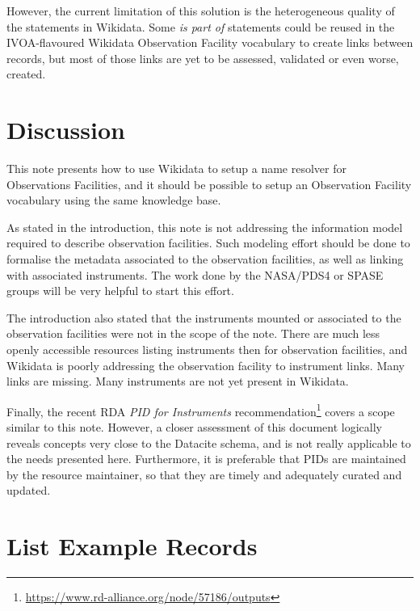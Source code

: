 \documentclass[11pt,a4paper]{ivoa}
\begin{document}
However, the current limitation of this solution is the heterogeneous 
quality of the statements in Wikidata. Some \emph{is part of} 
statements could be reused in the IVOA-flavoured Wikidata 
Observation Facility vocabulary to create links between 
records, but most of those links are yet to be assessed, validated
or even worse, created.  

\section{Discussion}
This note presents how to use Wikidata to setup a name resolver 
for Observations Facilities, and it should be possible to setup 
an Observation Facility vocabulary using the same knowledge base.

As stated in the introduction, this note is not addressing the 
information model required to describe observation facilities. 
Such modeling effort should be done to formalise the metadata 
associated to the observation facilities, as well as linking 
with associated instruments. The work done by the NASA/PDS4 or
SPASE groups will be very helpful to start this effort. 

The introduction also stated that the instruments mounted or 
associated to the observation facilities were not in the scope
of the note. There are much less openly accessible resources
listing instruments then for observation facilities, and 
Wikidata is poorly addressing the observation facility to 
instrument links. Many links are missing. Many instruments
are not yet present in Wikidata.

Finally, the recent RDA \emph{PID for Instruments} 
recommendation\footnote{\url{https://www.rd-alliance.org/node/57186/outputs}} 
covers a scope similar to this note. However, a closer 
assessment of this document logically reveals concepts very 
close to the Datacite schema, and is not really applicable to 
the needs presented here. Furthermore, it is preferable that 
PIDs are maintained by the resource maintainer, so that they 
are timely and adequately curated and updated. 

\appendix
\section{List Example Records}
\end{document}
